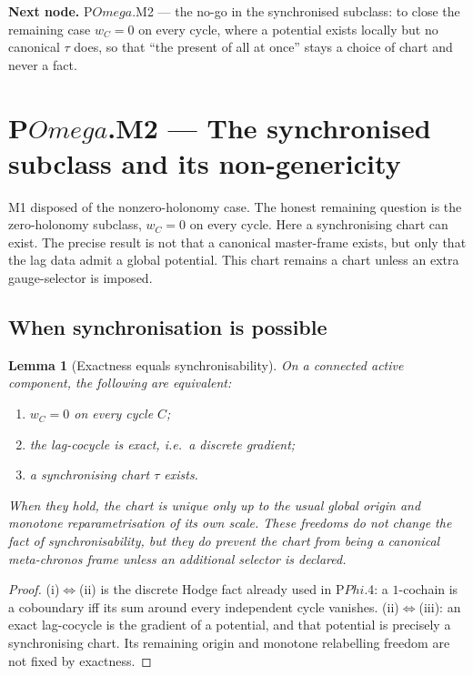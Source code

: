 \documentclass[11pt,a4paper]{article}
\def\Omega{Omega}%
\def\Phi{Phi}%
\def\emph#1{#1}%
\theoremstyle{definition}
\theoremstyle{plain}
\newtheorem{lemma}[definition]{Lemma}
\theoremstyle{remark}
\begin{document}
\medskip
\textbf{Next node.} P$\Omega$.M2 --- the no-go in the synchronised subclass: to close the
remaining case \(w_C=0\) on every cycle, where a potential exists locally but no \emph{canonical}
\(\tau\) does, so that ``the present of all at once'' stays a choice of chart and never a fact.

\section{P$\Omega$.M2 --- The synchronised subclass and its non-genericity}

M1 disposed of the nonzero-holonomy case. The honest remaining question is the
zero-holonomy subclass, \(w_C=0\) on every cycle. Here a synchronising chart can
exist. The precise result is not that a canonical master-frame exists, but only
that the lag data admit a global potential. This chart remains a chart unless an
extra gauge-selector is imposed.

\subsection{When synchronisation is possible}

\begin{lemma}[Exactness equals synchronisability]\label{lem:hodgeconverse}
On a connected active component, the following are equivalent:
\begin{enumerate}[label=\textup{(\roman*)},leftmargin=1.2cm]
\item \(w_C=0\) on every cycle \(C\);
\item the lag-cocycle is exact, i.e.\ a discrete gradient;
\item a synchronising chart \(\tau\) exists.
\end{enumerate}
When they hold, the chart is unique only up to the usual global origin and monotone
reparametrisation of its own scale. These freedoms do not change the fact of
synchronisability, but they do prevent the chart from being a canonical
meta-chronos frame unless an additional selector is declared.
\end{lemma}

\begin{proof}
(i)\(\Leftrightarrow\)(ii) is the discrete Hodge fact already used in
P\(\Phi\).4: a \(1\)-cochain is a coboundary iff its sum around every independent
cycle vanishes. (ii)\(\Leftrightarrow\)(iii): an exact lag-cocycle is the gradient
of a potential, and that potential is precisely a synchronising chart. Its
remaining origin and monotone relabelling freedom are not fixed by exactness.
\qedhere
\end{proof}
\end{document}
